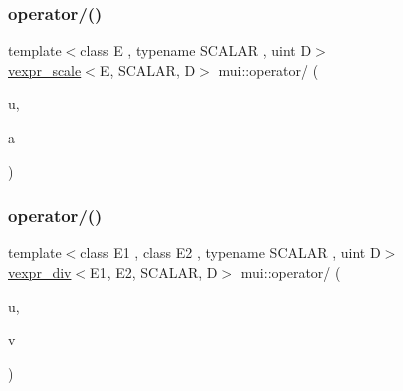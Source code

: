 \subsubsection{\texorpdfstring{operator/()}{operator/()}\hspace{0.1cm}{\footnotesize\ttfamily [1/3]}}
{\footnotesize\ttfamily template$<$class E , typename S\+C\+A\+L\+AR , uint D$>$ \\
\hyperlink{structmui_1_1vexpr__scale}{vexpr\+\_\+scale}$<$E, S\+C\+A\+L\+AR, D$>$ mui\+::operator/ (\begin{DoxyParamCaption}\item[{\hyperlink{structmui_1_1vexpr}{vexpr}$<$ E, S\+C\+A\+L\+AR, D $>$ const \&}]{u,  }\item[{S\+C\+A\+L\+AR const}]{a }\end{DoxyParamCaption})\hspace{0.3cm}{\ttfamily [inline]}}

\mbox{\label{namespacemui_a5e62c5e5c1e0d4d7e34e4a0fe8aa1c9b}} 
\subsubsection{\texorpdfstring{operator/()}{operator/()}\hspace{0.1cm}{\footnotesize\ttfamily [2/3]}}
{\footnotesize\ttfamily template$<$class E1 , class E2 , typename S\+C\+A\+L\+AR , uint D$>$ \\
\hyperlink{structmui_1_1vexpr__div}{vexpr\+\_\+div}$<$E1, E2, S\+C\+A\+L\+AR, D$>$ mui\+::operator/ (\begin{DoxyParamCaption}\item[{\hyperlink{structmui_1_1vexpr}{vexpr}$<$ E1, S\+C\+A\+L\+AR, D $>$ const \&}]{u,  }\item[{\hyperlink{structmui_1_1vexpr}{vexpr}$<$ E2, S\+C\+A\+L\+AR, D $>$ const \&}]{v }\end{DoxyParamCaption})\hspace{0.3cm}{\ttfamily [inline]}}

\mbox{\label{namespacemui_a33a2fcf411db9de5bafee840e1f6c899}} 
